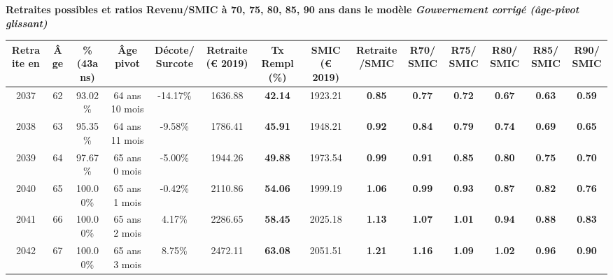  \vspace{0.1cm} 
{\bf \noindent Retraites possibles et ratios Revenu/SMIC à 70, 75, 80, 85, 90 ans dans le modèle \emph{Gouvernement corrigé (âge-pivot glissant)}}  
 
\begin{adjustbox}{max width=\textwidth} 
\begin{tabular}[htb]{|c|c||c|c|c||c|c||c|c||c|c|c|c|c|} 
\hline 
 Retraite en &  Âge &  \%(43ans) &  Âge pivot &  Décote/Surcote &  Retraite (\euro{} 2019) &  Tx Rempl(\%) &  SMIC (\euro{} 2019) &  Retraite/SMIC &  R70/SMIC &  R75/SMIC &  R80/SMIC &  R85/SMIC &  R90/SMIC \\ 
\hline \hline 
 2037 &  62 &  93.02\% &  64 ans 10 mois &  -14.17\% &  1636.88 &  {\bf 42.14} &  1923.21 &  {\bf {\color{red} 0.85}} &  {\bf {\color{red} 0.77}} &  {\bf {\color{red} 0.72}} &  {\bf {\color{red} 0.67}} &  {\bf {\color{red} 0.63}} &  {\bf {\color{red} 0.59}} \\ 
\hline 
 2038 &  63 &  95.35\% &  64 ans 11 mois &  -9.58\% &  1786.41 &  {\bf 45.91} &  1948.21 &  {\bf {\color{red} 0.92}} &  {\bf {\color{red} 0.84}} &  {\bf {\color{red} 0.79}} &  {\bf {\color{red} 0.74}} &  {\bf {\color{red} 0.69}} &  {\bf {\color{red} 0.65}} \\ 
\hline 
 2039 &  64 &  97.67\% &  65 ans 0 mois &  -5.00\% &  1944.26 &  {\bf 49.88} &  1973.54 &  {\bf {\color{red} 0.99}} &  {\bf {\color{red} 0.91}} &  {\bf {\color{red} 0.85}} &  {\bf {\color{red} 0.80}} &  {\bf {\color{red} 0.75}} &  {\bf {\color{red} 0.70}} \\ 
\hline 
 2040 &  65 &  100.00\% &  65 ans 1 mois &  -0.42\% &  2110.86 &  {\bf 54.06} &  1999.19 &  {\bf 1.06} &  {\bf {\color{red} 0.99}} &  {\bf {\color{red} 0.93}} &  {\bf {\color{red} 0.87}} &  {\bf {\color{red} 0.82}} &  {\bf {\color{red} 0.76}} \\ 
\hline 
 2041 &  66 &  100.00\% &  65 ans 2 mois &  4.17\% &  2286.65 &  {\bf 58.45} &  2025.18 &  {\bf 1.13} &  {\bf 1.07} &  {\bf 1.01} &  {\bf {\color{red} 0.94}} &  {\bf {\color{red} 0.88}} &  {\bf {\color{red} 0.83}} \\ 
\hline 
 2042 &  67 &  100.00\% &  65 ans 3 mois &  8.75\% &  2472.11 &  {\bf 63.08} &  2051.51 &  {\bf 1.21} &  {\bf 1.16} &  {\bf 1.09} &  {\bf 1.02} &  {\bf {\color{red} 0.96}} &  {\bf {\color{red} 0.90}} \\ 
\hline 
\hline 
\end{tabular} 
\end{adjustbox} 
 
